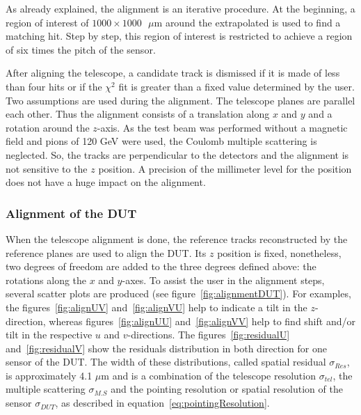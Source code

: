       As already explained, the alignment is an iterative procedure.
      At the beginning, a region of interest of $1000 \times 1000 \text{ }\mu\text{m}$ around the extrapolated is used to find a matching hit.
      Step by step, this region of interest is restricted to achieve a region of six times the pitch of the sensor.
      
      After aligning the telescope, a candidate track is dismissed if it is made of less than four hits or if the $\chi^2$ fit is greater than a fixed value determined by the user. 
      Two assumptions are used during the alignment. 
      The telescope planes are parallel each other.
      Thus the alignment consists of a translation along $x$ and $y$ and a rotation around the $z$-axis.
      As the test beam was performed without a magnetic field and pions of 120 GeV were used, the Coulomb multiple scattering is neglected.
      So, the tracks are perpendicular to the detectors and the alignment is not sensitive to the $z$ position.
      A precision of the millimeter level for the position does not have a huge impact on the alignment.

      \subsubsection{Alignment of the DUT}

      When the telescope alignment is done, the reference tracks reconstructed by the reference planes are used to align the \gls{DUT}.
      Its $z$ position is fixed, nonetheless, two degrees of freedom are added to the three degrees defined above: the rotations along the $x$ and $y$-axes.
      To assist the user in the alignment steps, several scatter plots are produced (see figure~\ref{fig:alignmentDUT}).
      For examples, the figures~\ref{fig:alignUV} and~\ref{fig:alignVU} help to indicate a tilt in the $z$-direction, whereas figures~\ref{fig:alignUU} and~\ref{fig:alignVV} help to find shift and/or tilt in the respective $u$ and $v$-directions.
      The figures~\ref{fig:residualU} and~\ref{fig:residualV} show the residuals distribution in both direction for one sensor of the \gls{DUT}.
      The width of these distributions, called spatial residual $\sigma_{Res}$, is approximately 4.1 $\mu\text{m}$ and is a combination of the telescope resolution $\sigma_{tel}$, the multiple scattering $\sigma_{M.S}$ and the pointing resolution or spatial resolution of the sensor $\sigma_{DUT}$, as described in equation~\ref{eq:pointingResolution}.
      
